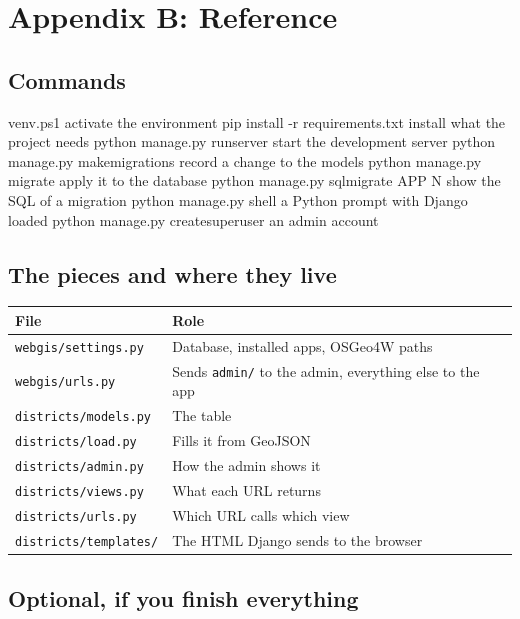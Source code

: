 \documentclass{article}
\newcommand{\cd}[1]{\texttt{#1}}
\begin{document}
\section*{Appendix B: Reference}

\subsection*{Commands}

\begin{code}
venv\Scripts\Activate.ps1          activate the environment
pip install -r requirements.txt    install what the project needs
python manage.py runserver         start the development server
python manage.py makemigrations    record a change to the models
python manage.py migrate           apply it to the database
python manage.py sqlmigrate APP N  show the SQL of a migration
python manage.py shell             a Python prompt with Django loaded
python manage.py createsuperuser   an admin account
\end{code}

\subsection*{The pieces and where they live}

\begin{tabularx}{\textwidth}{@{}L{5cm} X@{}}
\toprule
\textbf{File} & \textbf{Role} \\
\midrule
\cd{webgis/settings.py}  & Database, installed apps, OSGeo4W paths \\
\cd{webgis/urls.py}      & Sends \cd{admin/} to the admin, everything
                           else to the app \\
\cd{districts/models.py} & The table \\
\cd{districts/load.py}   & Fills it from GeoJSON \\
\cd{districts/admin.py}  & How the admin shows it \\
\cd{districts/views.py}  & What each URL returns \\
\cd{districts/urls.py}   & Which URL calls which view \\
\cd{districts/templates/} & The HTML Django sends to the browser \\
\bottomrule
\end{tabularx}

\subsection*{Optional, if you finish everything}
\end{document}
